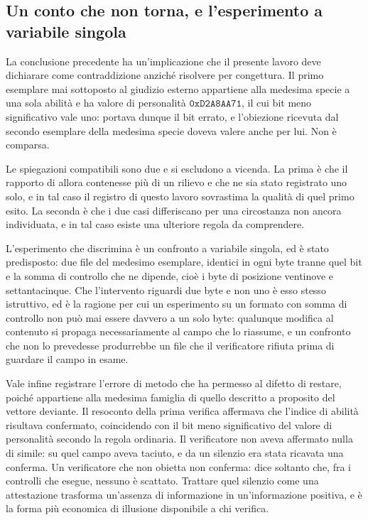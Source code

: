 \subsection*{Un conto che non torna, e l'esperimento a variabile singola}

La conclusione precedente ha un'implicazione che il presente lavoro deve dichiarare come contraddizione anziché risolvere per congettura. Il primo esemplare mai sottoposto al giudizio esterno appartiene alla medesima specie a una sola abilità e ha valore di personalità $\mathtt{0xD2A8AA71}$, il cui bit meno significativo vale uno: portava dunque il bit errato, e l'obiezione ricevuta dal secondo esemplare della medesima specie doveva valere anche per lui. Non è comparsa.

Le spiegazioni compatibili sono due e si escludono a vicenda. La prima è che il rapporto di allora contenesse più di un rilievo e che ne sia stato registrato uno solo, e in tal caso il registro di questo lavoro sovrastima la qualità di quel primo esito. La seconda è che i due casi differiscano per una circostanza non ancora individuata, e in tal caso esiste una ulteriore regola da comprendere.

L'esperimento che discrimina è un confronto a variabile singola, ed è stato predisposto: due file del medesimo esemplare, identici in ogni byte tranne quel bit e la somma di controllo che ne dipende, cioè i byte di posizione ventinove e settantacinque. Che l'intervento riguardi due byte e non uno è esso stesso istruttivo, ed è la ragione per cui un esperimento su un formato con somma di controllo non può mai essere davvero a un solo byte: qualunque modifica al contenuto si propaga necessariamente al campo che lo riassume, e un confronto che non lo prevedesse produrrebbe un file che il verificatore rifiuta prima di guardare il campo in esame.

Vale infine registrare l'errore di metodo che ha permesso al difetto di restare, poiché appartiene alla medesima famiglia di quello descritto a proposito del vettore deviante. Il resoconto della prima verifica affermava che l'indice di abilità risultava confermato, coincidendo con il bit meno significativo del valore di personalità secondo la regola ordinaria. Il verificatore non aveva affermato nulla di simile: su quel campo aveva taciuto, e da un silenzio era stata ricavata una conferma. Un verificatore che non obietta non conferma: dice soltanto che, fra i controlli che esegue, nessuno è scattato. Trattare quel silenzio come una attestazione trasforma un'assenza di informazione in un'informazione positiva, e è la forma più economica di illusione disponibile a chi verifica.
